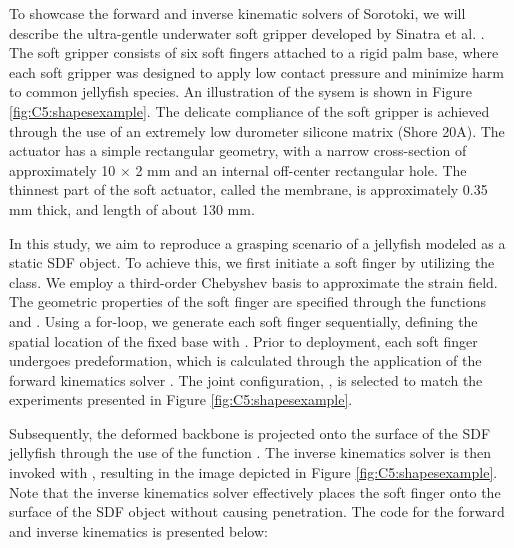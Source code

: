 \begin{example}
To showcase the forward and inverse kinematic solvers of Sorotoki, we will describe the ultra-gentle underwater soft gripper developed by Sinatra et al. \cite{Sinatra2019Aug}. The soft gripper consists of six soft fingers attached to a rigid palm base, where each soft gripper was designed to apply low contact pressure and minimize harm to common jellyfish species. An illustration of the sysem is shown in Figure \ref{fig:C5:shapesexample}. The delicate compliance of the soft gripper is achieved through the use of an extremely low durometer silicone matrix (Shore 20A). The actuator has a simple rectangular geometry, with a narrow cross-section of approximately 10 $\times$ 2 \si{\milli \meter} and an internal off-center rectangular hole. The thinnest part of the soft actuator, called the membrane, is approximately 0.35 \si{\milli \meter} thick, and length of about 130 \si{\milli \meter}.

In this study, we aim to reproduce a grasping scenario of a jellyfish modeled as a static SDF object. To achieve this, we first initiate a soft finger by utilizing the  class. We employ a third-order Chebyshev basis to approximate the strain field. The geometric properties of the soft finger are specified through the functions  and . Using a for-loop, we generate each soft finger sequentially, defining the spatial location of the fixed base with . Prior to deployment, each soft finger undergoes predeformation, which is calculated through the application of the forward kinematics solver . The joint configuration, , is selected to match the experiments presented in Figure \ref{fig:C5:shapesexample}.

Subsequently, the deformed backbone is projected onto the surface of the SDF jellyfish through the use of the function . The inverse kinematics solver is then invoked with , resulting in the image depicted in Figure \ref{fig:C5:shapesexample}. Note that the inverse kinematics solver effectively places the soft finger onto the surface of the SDF object without causing penetration. The code for the forward and inverse kinematics is presented below:
\end{example}


